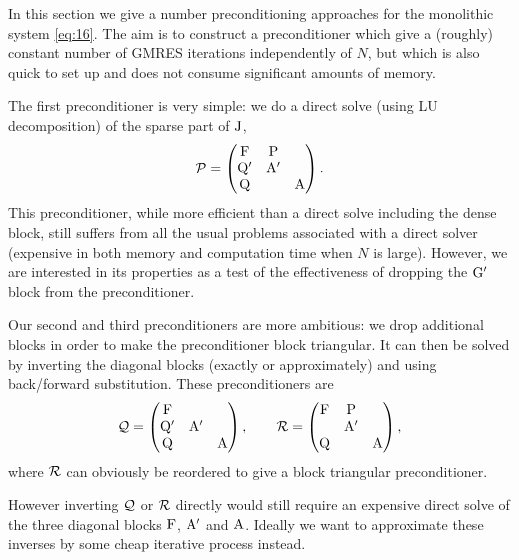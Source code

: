 In this section we give a number preconditioning approaches for the monolithic system \cref{eq:16}.
The aim is to construct a preconditioner which give a (roughly) constant number of GMRES iterations independently of $N$, but which is also quick to set up and does not consume significant amounts of memory.

The first preconditioner is very simple: we do a direct solve (using LU decomposition) of the sparse part of $\mathrm{J}$, \ie
\begin{equation}
  \mathcal{P} = 
  \begin{pmatrix}
    \mathrm{F}       & \mathrm{P}     &  \\
    \mathrm{Q}'       & \mathrm{A}'    &   \\
    \mathrm{Q}       &         &   \mathrm{A}
  \end{pmatrix}.
\end{equation}
This preconditioner, while more efficient than a direct solve including the dense block, still suffers from all the usual problems associated with a direct solver (\ie expensive in both memory and computation time when $N$ is large).
However, we are interested in its properties as a test of the effectiveness of dropping the $\mathrm{G}'$ block from the preconditioner.

Our second and third preconditioners are more ambitious: we drop additional blocks in order to make the preconditioner block triangular.
It can then be solved by inverting the diagonal blocks (exactly or approximately) and using back/forward substitution.
These preconditioners are
\begin{equation}
  \mathcal{Q} = 
  \begin{pmatrix}
    \mathrm{F}       &           &  \\
    \mathrm{Q}'       & \mathrm{A}'&   \\
    \mathrm{Q}       &           &   \mathrm{A}
  \end{pmatrix},
  \qquad
  \mathcal{R} = 
  \begin{pmatrix}
    \mathrm{F}       & \mathrm{P}       &  \\
    & \mathrm{A}' &   \\
    \mathrm{Q}       &           &   \mathrm{A}
  \end{pmatrix},
  \label{eq:ms-block-prec-drop-p}
\end{equation}
where $\mathcal{R}$ can obviously be reordered to give a block triangular preconditioner.

However inverting $\mathcal{Q}$ or $\mathcal{R}$ directly would still require an expensive direct solve of the three diagonal blocks $\mathrm{F}$, $\mathrm{A}'$ and $\mathrm{A}$.
Ideally we want to approximate these inverses by some cheap iterative process instead.

